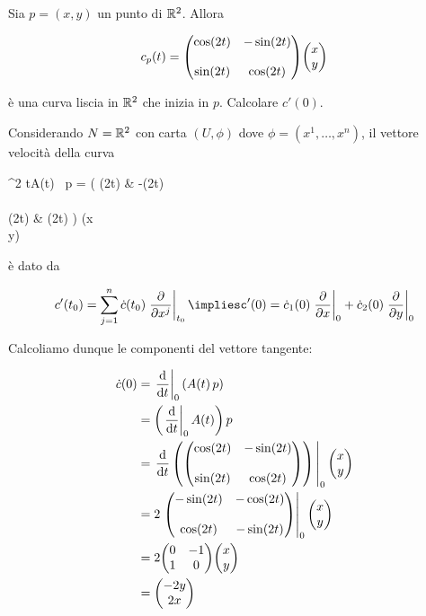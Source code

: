 \begin{tcolorbox}
	Sia $ p = (x,y) $ un punto di $ \mathbb{R}^{2} $. Allora
	
	\begin{equation}
		c_{p}(t) = \mqty( \cos(2t) & -\sin(2t) \\\\ \sin(2t) & \cos(2t) ) \mqty(x \\ y)
	\end{equation}
	
	è una curva liscia in $ \mathbb{R}^{2} $ che inizia in $ p $. Calcolare $ c'(0) $.
\end{tcolorbox}

Considerando $ N = \mathbb{R}^{2} $ con carta $ (U,\phi) $ dove $ \phi = (x^{1},\dots,x^{n}) $, il vettore velocità della curva

%
	{\R}{\R^{2}}%
	{t}{A(t) \, p = \mqty( \cos(2t) & -\sin(2t) \\\\ \sin(2t) & \cos(2t) ) \mqty(x \\ y)}

è dato da

\begin{equation}
	c'(t_{0}) = \sum_{j=1}^{n} \dot{c}(t_{0}) \eval{\pdv{x^{j}}}_{t_{0}}%
	\implies%
	c'(0) = \dot{c}_{1}(0) \eval{\pdv{x}}_{0} + \dot{c}_{2}(0) \eval{\pdv{y}}_{0}
\end{equation}

Calcoliamo dunque le componenti del vettore tangente:

\begin{align}
	\begin{split}
		\dot{c}(0) &= \eval{\dv{t}}_{0}(A(t) \, p)\\
		&= \left( \eval{\dv{t}}_{0} A(t) \right) p\\
		&= \eval{ \dv{t} \left( \mqty( \cos(2t) & -\sin(2t) \\\\ \sin(2t) & \cos(2t) ) \right) }_{0} \mqty(x \\ y)\\
		&= 2 \eval{ \mqty( -\sin(2t) & -\cos(2t) \\\\ \cos(2t) & -\sin(2t) ) }_{0} \mqty(x \\ y)\\
		&= 2 \mqty( 0 & -1 \\ 1 & 0 ) \mqty(x \\ y)\\
		&= \mqty(-2y \\ 2x)
	\end{split}
\end{align}

